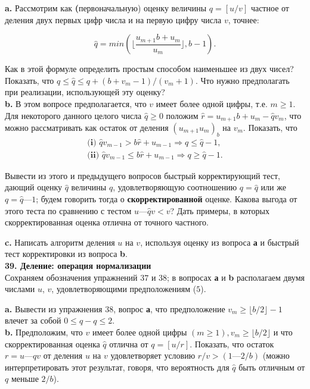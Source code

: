 \textbf{a.} Рассмотрим как \textbf(первоначальную) оценку величины $q = [u/v]$ частное от деления двух первых цифр числа и на первую цифру числа $v$, точнее:

\[
\widehat{q} = min (\lfloor \frac{u_{m+1}b+u_{m}}{u_{m}} \rfloor , b - 1).
\]

\noindent Как в этой формуле определить простым способом наименьшее из двух чисел? Показать, что $q \leqslant \widehat{q} \leqslant q + (b + v_{m} - 1)/(v_{m} + 1)$. Что нужно предполагать при реализации, использующей эту оценку?\\

\textbf{b.} В этом вопросе предполагается, что $v$ имеет более одной цифры, т.е. $m \geqslant 1$. Для некоторого данного целого числа $\widehat{q} \geqslant 0$ положим $\widehat{r} = u_{m+1}b + u_{m} - \widehat{q}v_{m}$, что можно рассматривать как остаток от деления $(u_{m+1}u_{m})_{b}$ на $v_{m}$. Показать, что
\begin{eqnarray*}
\textbf{(i) } \hat{q}v_{m-1} > b\hat{r} + u_{m-1} \Longrightarrow q \le \hat{q}-1,\\
\textbf{(ii) } \hat{q}v_{m-1} \le b\hat{r} + u_{m-1} \Longrightarrow q \ge \hat{q}-1.
\end{eqnarray*}

Вывести из этого и предыдущего вопросов быстрый корректирующий тест, дающий оценку $\widehat{q}$ величины $q$, удовлетворяющую соотношению $q = \widehat{q}$ или же $q = \widehat{q} — 1$; будем говорить тогда о \textbf{скорректированной} оценке. Какова выгода от этого теста по сравнению с тестом $u — \widehat{q}v < v$? Дать примеры, в которых скорректированная оценка отлична от точного частного.

\textbf{c.} Написать алгоритм деления $u$ на $v$, используя оценку из вопроса \textbf{а} и быстрый тест корректировки из вопроса \textbf{b}.
\\

\textbf{39. Деление: операция нормализации}\\

Сохраняем обозначения упражнений $37$ и $38$; в вопросах \textbf{а} и \textbf{b} располагаем двумя числами $u$, $v$, удовлетворяющими предположениям ($5$).

\textbf{a.} Вывести из упражнения $38$, вопрос \textbf{а}, что предположение $v_{m} \geqslant \lfloor b/2 \rfloor -1$ влечет за собой $0\leqslant \widehat{q} - q \leqslant 2$.\\

\textbf{b.} Предположим, что $v$ имеет более одной цифры $(m \geqslant 1), v_{m} \geqslant \lfloor b/2 \rfloor$ и что скорректированная оценка $\widehat{q}$ отлична от $q = [u/r]$. Показать, что остаток $r = u — qv$ от деления $u$ на $v$ удовлетворяет условию $r/v > (1 — 2/b)$ (можно интерпретировать этот результат, говоря, что вероятность для $\widehat{q}$ быть отличным от $q$ меньше $2/b$).\\

